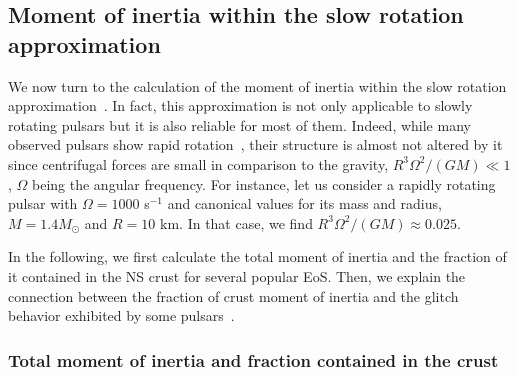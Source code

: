 \subsection{Moment of inertia within the slow rotation
approximation}\label{subsec:moi}

We now turn to the calculation of the moment of inertia within the slow 
rotation approximation~\cite{Hartle1967}. In 
fact, this approximation is not only applicable to slowly rotating pulsars but 
it is also reliable for most of them. Indeed, while many observed pulsars show  
rapid rotation~\cite{Stovall2013}, their structure is almost not altered by it 
since centrifugal forces are small in comparison to the gravity, 
$R^3\Omega^2/(GM) \ll 1$, $\Omega$ being the angular frequency. For instance, 
let us consider a rapidly rotating pulsar with $\Omega = 1000$ s$^{-1}$ and 
canonical values for its mass and radius, $M=1.4M_\odot$ and $R=10$ km. In that 
case, we find $R^3\Omega^2/(GM) \approx 0.025$.

In the following, we first calculate the total moment of inertia and the 
fraction of it contained in the NS crust for several popular EoS. Then, we 
explain the connection between the fraction of crust moment of inertia 
and the glitch behavior exhibited by some pulsars~\cite{Espinoza2011}.

\subsubsection{Total moment of inertia and fraction contained in the crust}

